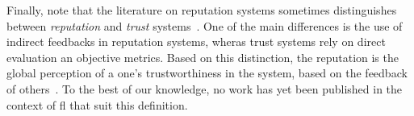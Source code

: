 Finally, note that the literature on reputation systems sometimes distinguishes between \emph{reputation} and \emph{trust} systems~\cite{chen_TRMIoTtrustmanagement_2011,zohrafilali_GlobalTrustTrust_2015}.
One of the main differences is the use of indirect feedbacks in reputation systems, wheras trust systems rely on direct evaluation an objective metrics.
Based on this distinction, the reputation is the global perception of a one's trustworthiness in the system, based on the feedback of others~\cite{chen_TRMIoTtrustmanagement_2011}.
To the best of our knowledge, no work has yet been published in the context of \gls{fl} that suit this definition.
